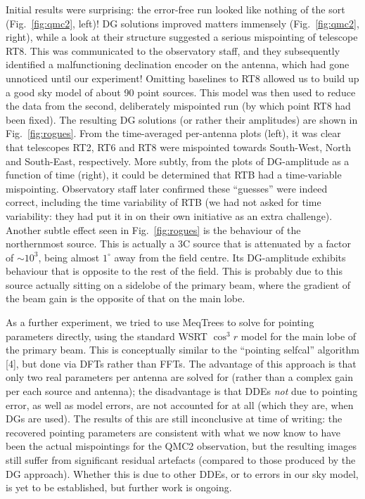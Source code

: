 \documentclass{aps2010} \special{papersize=8.5in,11in}
\begin{document}
Initial results were surprising: the error-free run looked like nothing of the sort (Fig.~\ref{fig:qmc2}, left)! DG solutions improved matters immensely (Fig.~\ref{fig:qmc2}, right), while a look at their structure suggested a serious mispointing of telescope RT8. This was communicated to the observatory staff, and they subsequently identified a malfunctioning declination encoder on the antenna, which had gone unnoticed until our experiment! Omitting baselines to RT8 allowed us to build up a good sky model of about 90 point sources. This model was then used to reduce the data from the second, deliberately mispointed run (by which point RT8 had been fixed). The resulting DG solutions (or rather their amplitudes) are shown in Fig.~\ref{fig:rogues}. From the time-averaged per-antenna plots (left), it was clear that telescopes RT2, RT6 and RT8 were mispointed towards South-West, North and South-East, respectively. More subtly, from the plots of DG-amplitude as a function of time (right), it could be determined that RTB had a time-variable mispointing. Observatory staff later confirmed these ``guesses'' were indeed correct, including the time variability of RTB (we had not asked for time variability: they had put it in on their own initiative as an extra challenge). Another subtle effect seen in Fig.~\ref{fig:rogues} is the behaviour of the northernmost source. This is actually a 3C source that is attenuated by a factor of $\sim10^3$, being almost $1^\circ$ away from the field centre. Its DG-amplitude exhibits behaviour that is opposite to the rest of the field. This is probably due to this source actually sitting on a sidelobe of the primary beam, where the gradient of the beam gain is the opposite of that on the main lobe.

As a further experiment, we tried to use MeqTrees to solve for pointing parameters directly, using the standard WSRT $\cos^3r$ model for the main lobe of the primary beam. This is conceptually similar to the ``pointing selfcal'' algorithm [4], but done via DFTs rather than FFTs. The advantage of this approach is that only two real parameters per antenna are solved for (rather than a complex gain per each source and antenna); the disadvantage is that DDEs {\em not} due to pointing error, as well as model errors, are not accounted for at all (which they are, when DGs are used). The results of this are still inconclusive at time of writing: the recovered pointing parameters are consistent with what we now know to have been the actual mispointings for the QMC2 observation, but the resulting images still suffer from significant residual artefacts (compared to those produced by the DG approach). Whether this is due to other DDEs, or to errors in our sky model, is yet to be established, but further work is ongoing.
\end{document}
